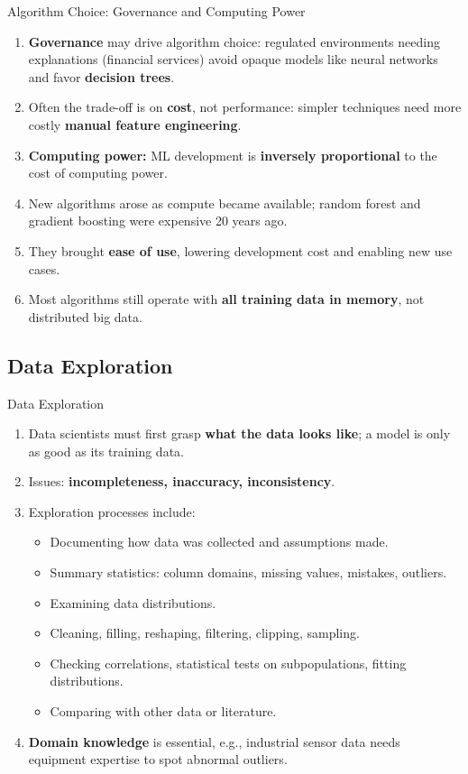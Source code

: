 \begin{frame}{Algorithm Choice: Governance and Computing Power}
\begin{enumerate}
\item<1-> \textbf{Governance} may drive algorithm choice: regulated environments needing explanations (financial services) avoid opaque models like neural networks and favor \textbf{decision trees}.
\item<2-> Often the trade-off is on \textbf{cost}, not performance: simpler techniques need more costly \textbf{manual feature engineering}.
\item<3-> \textbf{Computing power:} ML development is \textbf{inversely proportional} to the cost of computing power.
\item<4-> New algorithms arose as compute became available; random forest and gradient boosting were expensive 20 years ago.
\item<5-> They brought \textbf{ease of use}, lowering development cost and enabling new use cases.
\item<6-> Most algorithms still operate with \textbf{all training data in memory}, not distributed big data.
\end{enumerate}
\end{frame}

\subsection{Data Exploration}

\begin{frame}{Data Exploration}
\begin{enumerate}
\item<1-> Data scientists must first grasp \textbf{what the data looks like}; a model is only as good as its training data.
\item<2-> Issues: \textbf{incompleteness, inaccuracy, inconsistency}.
\item<3-> Exploration processes include:
    \begin{itemize}
    \item Documenting how data was collected and assumptions made.
    \item Summary statistics: column domains, missing values, mistakes, outliers.
    \item Examining data distributions.
    \item Cleaning, filling, reshaping, filtering, clipping, sampling.
    \item Checking correlations, statistical tests on subpopulations, fitting distributions.
    \item Comparing with other data or literature.
    \end{itemize}
\item<4-> \textbf{Domain knowledge} is essential, e.g., industrial sensor data needs equipment expertise to spot abnormal outliers.
\end{enumerate}
\end{frame}

